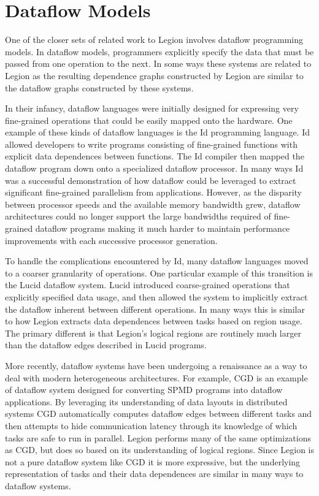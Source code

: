 \section{Dataflow Models}
\label{sec:dataflow}

One of the closer sets of related work to Legion
involves dataflow programming models.  In dataflow
models, programmers explicitly specify the data
that must be passed from one operation to the next.
In some ways these systems are related to Legion
as the resulting dependence graphs constructed
by Legion are similar to the dataflow graphs
constructed by these systems.

In their infancy, dataflow languages were initially
designed for expressing very fine-grained operations
that could be easily mapped onto the hardware. 
One example of these kinds of dataflow languages
is the Id programming language\cite{Id90}. Id 
allowed developers to write programs consisting of
fine-grained functions with explicit data dependences
between functions. The Id compiler then mapped 
the dataflow program down onto a specialized dataflow
processor. In many ways Id was a successful demonstration
of how dataflow could be leveraged to extract
significant fine-grained parallelism from applications.
However, as the disparity between processor speeds
and the available memory bandwidth grew, dataflow
architectures could no longer support the large
bandwidths required of fine-grained dataflow
programs making it much harder to maintain
performance improvements with each successive
processor generation.

To handle the complications encountered by Id,
many dataflow languages moved to a coarser
granularity of operations. One particular example
of this transition is the Lucid dataflow
system\cite{Lucid95}. Lucid introduced coarse-grained 
operations that explicitly specified
data usage, and then allowed the system to 
implicitly extract the dataflow inherent between
different operations.  In many ways this is
similar to how Legion extracts data dependences
between tasks based on region usage.  The primary
different is that Legion's logical regions are
routinely much larger than the dataflow edges
described in Lucid programs. 

More recently, dataflow systems have been undergoing
a renaissance as a way to deal with modern heterogeneous
architectures. For example, CGD is an example of
dataflow system designed for converting SPMD programs
into dataflow applications\cite{CGD09}. By leveraging
its understanding of data layouts in distributed systems
CGD automatically computes dataflow edges between
different tasks and then attempts to hide communication
latency through its knowledge of which tasks are safe to
run in parallel. Legion performs many of the same
optimizations as CGD, but does so based on its understanding
of logical regions.  Since Legion is not a pure
dataflow system like CGD it is more expressive, but
the underlying representation of tasks and their
data dependences are similar in many ways to dataflow
systems.

